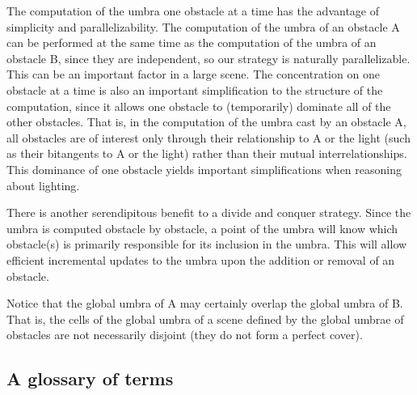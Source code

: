 \documentclass[12pt]{article}
\begin{document}
The computation of the umbra one obstacle at a time has the advantage
of simplicity and parallelizability.
The computation of the umbra of an obstacle A can be performed at the same
time as the computation of the umbra of an obstacle B, since they are
independent, so our strategy is naturally parallelizable.
This can be an important factor in a large scene.
The concentration on one obstacle at a time is
also an important simplification to the structure of the computation,
since it allows one obstacle to (temporarily) dominate all of the other obstacles.
That is, in the computation of the umbra cast by an obstacle A, 
all obstacles are of interest only through their relationship
to A or the light (such as their bitangents to A or the light)
rather than their mutual interrelationships.
This dominance of one obstacle yields important simplifications when
reasoning about lighting.

There is another serendipitous benefit to a divide and conquer strategy.
Since the umbra is computed obstacle by obstacle,
a point of the umbra will know which obstacle(s) is primarily 
responsible for its inclusion in the umbra.
This will allow efficient incremental updates to the umbra upon the addition
or removal of an obstacle.

Notice that the global umbra of A may certainly overlap the global umbra of B.
That is, the cells of the global umbra of a scene defined by the global umbrae
of obstacles are not necessarily disjoint (they do not form a perfect cover).


\subsection{A glossary of terms}
\end{document}
